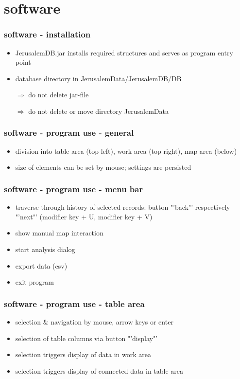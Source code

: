 \documentclass{beamer}
\begin{document}
\section{software}	
\begin{frame}
			\frametitle{software - installation} 
				\begin{itemize}
					\item JerusalemDB.jar installs required structures and serves as program entry point
					\item database directory in JerusalemData/JerusalemDB/DB
					\item[$\Rightarrow$] do not delete jar-file
					\item[$\Rightarrow$] 	do not delete or move directory JerusalemData
				\end{itemize}
	\end{frame}	

\begin{frame}
			\frametitle{software - program use - general} 
				\begin{itemize}
					\item division into table area (top left), work area (top right), map area (below)
					\item size of elements can be set by mouse; settings are persisted
				\end{itemize}
	\end{frame}	
	
\begin{frame}
			\frametitle{software - program use - menu bar} 
				\begin{itemize}
					\item traverse through history of selected records: button "'back"' respectively "'next"' (modifier key + U, modifier key + V)					
					\item show manual map interaction
					\item start analysis dialog
					\item export data (csv)
					\item exit program
				\end{itemize}
	\end{frame}		
	
	\begin{frame}
			\frametitle{software - program use - table area} 
				\begin{itemize}
					\item selection \& navigation by mouse, arrow keys or enter
					\item selection of table columns via button "'display"'
					\item selection triggers display of data in work area
					\item selection triggers display of connected data in table area
				\end{itemize}
	\end{frame}	
	
\end{document}
